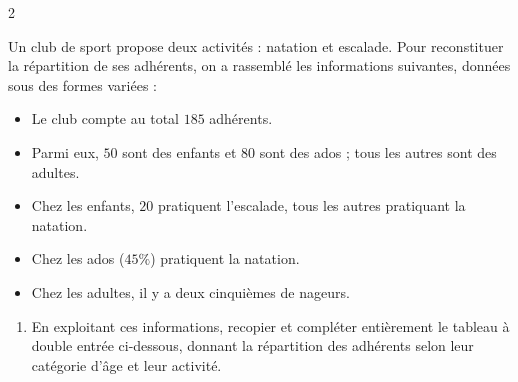 \documentclass[10pt,a4paper]{article}
\begin{document}
\begin{multicols}{2}

\begin{exo}
Un club de sport propose deux activités : natation et escalade. Pour reconstituer la répartition de ses adhérents, on a rassemblé les informations suivantes, données sous des formes variées :
\begin{itemize}
    \item Le club compte au total \(185\) adhérents.
    \item Parmi eux, \(50\) sont des enfants et \(80\) sont des ados ; tous les autres sont des adultes.
    \item Chez les enfants, \(20\) pratiquent l'escalade, tous les autres pratiquant la natation.
    \item Chez les ados (\(45\%\)) pratiquent la natation.
    \item Chez les adultes, il y a deux cinquièmes de nageurs.
\end{itemize}

\begin{enumerate}[leftmargin=*]
    \item En exploitant ces informations, recopier et compléter entièrement le tableau à double entrée ci-dessous, donnant la répartition des adhérents selon leur catégorie d'âge et leur activité.


\end{enumerate}
\end{exo}
\end{multicols}
\end{document}

